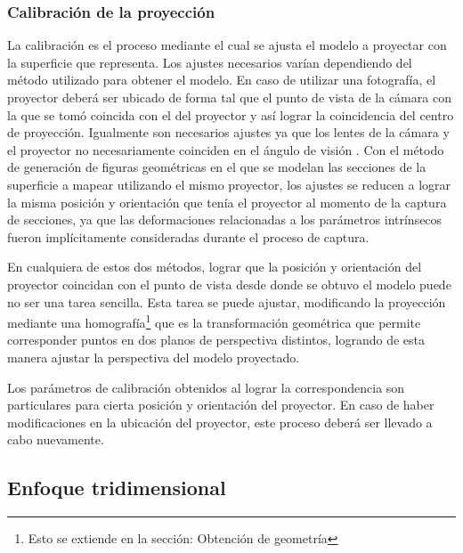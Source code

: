 \subsubsection{Calibración de la proyección}
La calibración es el proceso mediante el cual se ajusta el modelo a proyectar con la superficie que representa.
Los ajustes necesarios varían dependiendo del método utilizado para obtener el modelo. En caso de utilizar una fotografía, el proyector deberá ser ubicado de forma tal que el punto de vista de la cámara con la que se tomó coincida con el del proyector y así lograr la coincidencia del centro de proyección. Igualmente son necesarios ajustes ya que los lentes de la cámara y el proyector no necesariamente coinciden en el ángulo de visión \cite{LibroCompGrafica2}\cite{LibroPhotographicOptics}. Con el método de generación de figuras geométricas en el que se modelan las secciones de la superficie a mapear utilizando el mismo proyector, los ajustes se reducen a lograr la misma posición y orientación que tenía el proyector al momento de la captura de secciones, ya que las deformaciones relacionadas a los parámetros intrínsecos fueron implícitamente consideradas durante el proceso de captura.

En cualquiera de estos dos métodos, lograr que la posición y orientación del proyector coincidan con el punto de vista desde donde se obtuvo el modelo puede no ser una tarea sencilla. Esta tarea se puede ajustar, modificando la proyección mediante una homografía\footnote{Esto se extiende en la sección: Obtención de geometría} que es la transformación geométrica que permite corresponder puntos en dos planos de perspectiva distintos, logrando de esta manera ajustar la perspectiva del modelo proyectado.

Los parámetros de calibración obtenidos al lograr la correspondencia son particulares para cierta posición y orientación del proyector. En caso de haber modificaciones en la ubicación del proyector, este proceso deberá ser llevado a cabo nuevamente.

\subsection{Enfoque tridimensional}
